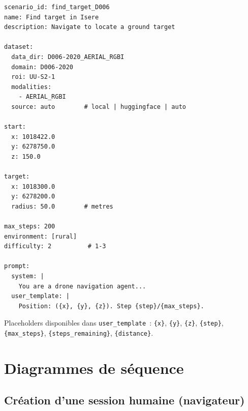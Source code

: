 \documentclass[a4paper, 11pt, french]{article}
\newcommand{\code}[1]{\texttt{#1}}
\begin{document}
\begin{lstlisting}[style=yaml, caption={Structure d'un scénario YAML}]
scenario_id: find_target_D006
name: Find target in Isere
description: Navigate to locate a ground target

dataset:
  data_dir: D006-2020_AERIAL_RGBI
  domain: D006-2020
  roi: UU-S2-1
  modalities:
    - AERIAL_RGBI
  source: auto        # local | huggingface | auto

start:
  x: 1018422.0
  y: 6278750.0
  z: 150.0

target:
  x: 1018300.0
  y: 6278200.0
  radius: 50.0        # metres

max_steps: 200
environment: [rural]
difficulty: 2          # 1-3

prompt:
  system: |
    You are a drone navigation agent...
  user_template: |
    Position: ({x}, {y}, {z}). Step {step}/{max_steps}.
\end{lstlisting}

Placeholders disponibles dans \code{user\_template}~: \code{\{x\}},
\code{\{y\}}, \code{\{z\}}, \code{\{step\}}, \code{\{max\_steps\}},
\code{\{steps\_remaining\}}, \code{\{distance\}}.

\section{Diagrammes de séquence}
\label{sec:sequences}

\subsection{Création d'une session humaine (navigateur)}
\end{document}
